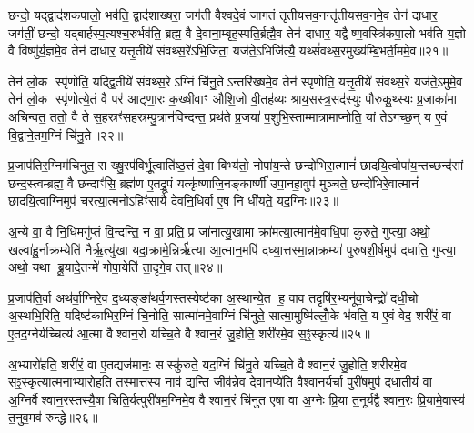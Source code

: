 छन्दो॒ यद्द्वाद॑शकपालो॒ भव॑ति॒ द्वाद॑शाख्षरा॒ जग॑ती वैश्वदे॒वं जाग॑तं तृतीयसव॒नन्तृ॑तीयसव॒नमे॒व तेन॑ दाधार॒ जग॑तीं॒ छन्दो॒ यद्बा॑र्\mbox{}हस्प॒त्यश्च॒रुर्भव॑ति॒ ब्रह्म॒ वै दे॒वाना॒म्बृह॒स्पति॒र्ब्रह्मै॒व तेन॑ दाधार॒ यद्वैष्ण॒वस्त्रि॑कपा॒लो भव॑ति य॒ज्ञो वै विष्णु॑र्य॒ज्ञमे॒व तेन॑ दाधार॒ यत्तृ॒तीये॑ संवथ्स॒रे॑ऽभि॒जिता॒ यज॑ते॒ऽभिजि॑त्यै॒ यथ्सं॑वथ्स॒रमुख्य॑म्बि॒भर्ती॒ममे॒व॥२१॥

तेन॑ लो॒क स्पृ॑णोति॒ यद्द्वि॒तीये॑ संवथ्स॒रेऽग्निं चि॑नु॒तेऽन्तरि॑ख्षमे॒व तेन॑ स्पृणोति॒ यत्तृ॒तीये॑ संवथ्स॒रे यज॑ते॒ऽमुमे॒व तेन॑ लो॒क स्पृ॑णोत्ये॒तं वै पर॑ आट्णा॒रः क॒ख्षीवाꣳ॑ औशि॒जो वी॒तह॑व्यः श्राय॒सस्त्र॒सद॑स्युः पौरुकु॒थ्स्यः प्र॒जाका॑मा अचिन्वत॒ ततो॒ वै ते स॒हस्रꣳ॑सहस्रम्पु॒त्रान॑विन्दन्त॒ प्रथ॑ते प्र॒जया॑ प॒शुभि॒स्ताम्मात्रा॑माप्नोति॒ यां तेऽग॑च्छ॒न् य ए॒वं वि॒द्वाने॒तम॒ग्निं चि॑नु॒ते॥२२॥

{\anuvakamend[{दा॒धा॒र॒ त्रि॒ष्टुभ॑मि॒ममे॒वैवं च॒त्वारि॑ च॥५॥}]}

प्र॒जाप॑तिर॒ग्निम॑चिनुत॒ स ख्षु॒रप॑विर्भू॒त्वाति॑ष्ठ॒त्तं दे॒वा बिभ्य॑तो॒ नोपा॑य॒न्ते छन्दो॑भिरा॒त्मानं॑ छादयि॒त्वोपा॑य॒न्तच्छन्द॑सां छन्द॒स्त्वम्ब्रह्म॒ वै छन्दाꣳ॑सि॒ ब्रह्म॑ण ए॒तद्रू॒पं यत्कृ॑ष्णाजि॒नङ्कार्ष्णी॑ उपा॒नहा॒वुप॑ मुञ्चते॒ छन्दो॑भिरे॒वात्मानं॑ छादयि॒त्वाग्निमुप॑ चरत्या॒त्मनोऽहिꣳ॑सायै देवनि॒धिर्वा ए॒ष नि धी॑यते॒ यद॒ग्निः॥२३॥

अ॒न्ये वा॒ वै नि॒धिमगु॑प्तं वि॒न्दन्ति॒ न वा॒ प्रति॒ प्र जा॑नात्यु॒खामा क्रा॑मत्या॒त्मान॑मे॒वाधि॒पां कु॑रुते॒ गुप्त्या॒ अथो॒ खल्वा॑हु॒र्नाक्रम्येति॑ नैर्\mbox{}ऋ॒त्यु॑खा यदा॒क्रामे॒न्निर्\mbox{}ऋ॑त्या आ॒त्मान॒मपि॑ दध्या॒त्तस्मा॒न्नाक्रम्या॑ पुरुषशी॒र्\mbox{}षमुप॑ दधाति॒ गुप्त्या॒ अथो॒ यथा ब्रू॒यादे॒तन्मे॑ गोपा॒येति॑ ता॒दृगे॒व तत्॥२४॥

प्र॒जाप॑ति॒र्वा अथ॑र्वा॒ग्निरे॒व द॒ध्यङ्ङा॑थर्व॒णस्तस्येष्ट॑का अ॒स्थान्ये॒त ह॒ वाव तदृषि॑र॒भ्यनू॑वा॒चेन्द्रो॑ दधी॒चो अ॒स्थभि॒रिति॒ यदिष्ट॑काभिर॒ग्निं चि॒नोति॒ सात्मा॑नमे॒वाग्निं चि॑नुते॒ सात्मा॒मुष्मि॑ल्लोँ॒के भ॑वति॒ य ए॒वं वेद॒ शरी॑रं॒ वा ए॒तद॒ग्नेर्यच्चित्य॑ आ॒त्मा वैश्वान॒रो यच्चि॒ते वैश्वान॒रं जु॒होति॒ शरी॑रमे॒व स॒ꣵ॒स्कृत्य॑॥२५॥

अ॒भ्यारो॑हति॒ शरी॑रं॒ वा ए॒तद्यज॑मानः॒ सस्कु॑रुते॒ यद॒ग्निं चि॑नु॒ते यच्चि॒ते वैश्वान॒रं जु॒होति॒ शरी॑रमे॒व स॒ꣵ॒स्कृत्या॒त्मना॒भ्यारो॑हति॒ तस्मा॒त्तस्य॒ नाव॑ द्यन्ति॒ जीव॑न्ने॒व दे॒वानप्ये॑ति वैश्वान॒र्यर्चा पुरी॑ष॒मुप॑ दधाती॒यं वा अ॒ग्निर्वैश्वान॒रस्तस्यै॒षा चिति॒र्यत्पुरी॑षम॒ग्निमे॒व वैश्वान॒रं चि॑नुत ए॒षा वा अ॒ग्नेः प्रि॒या त॒नूर्यद्वैश्वान॒रः प्रि॒यामे॒वास्य॑ त॒नुव॒मव॑ रुन्द्धे॥२६॥

